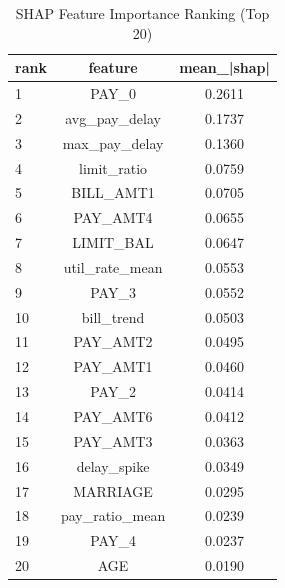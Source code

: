 \begin{table}
\centering
\caption{SHAP Feature Importance Ranking (Top 20)}
\label{tab:shap_ranking}
\begin{tabular}{lcc}
\toprule
rank & feature & mean_|shap| \\
\midrule
1 & PAY_0 & 0.2611 \\
2 & avg_pay_delay & 0.1737 \\
3 & max_pay_delay & 0.1360 \\
4 & limit_ratio & 0.0759 \\
5 & BILL_AMT1 & 0.0705 \\
6 & PAY_AMT4 & 0.0655 \\
7 & LIMIT_BAL & 0.0647 \\
8 & util_rate_mean & 0.0553 \\
9 & PAY_3 & 0.0552 \\
10 & bill_trend & 0.0503 \\
11 & PAY_AMT2 & 0.0495 \\
12 & PAY_AMT1 & 0.0460 \\
13 & PAY_2 & 0.0414 \\
14 & PAY_AMT6 & 0.0412 \\
15 & PAY_AMT3 & 0.0363 \\
16 & delay_spike & 0.0349 \\
17 & MARRIAGE & 0.0295 \\
18 & pay_ratio_mean & 0.0239 \\
19 & PAY_4 & 0.0237 \\
20 & AGE & 0.0190 \\
\bottomrule
\end{tabular}
\end{table}
